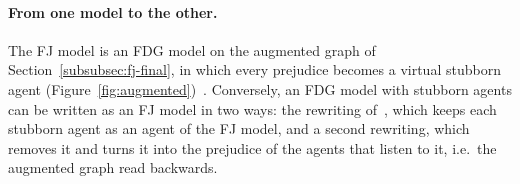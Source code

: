 \paragraph{From one model to the other.}
The FJ model is an FDG model on the augmented graph of Section~\ref{subsubsec:fj-final},
in which every prejudice becomes a virtual stubborn agent
(Figure~\ref{fig:augmented})~\cite{proskurnikov2017tutorial}. Conversely, an FDG model
with stubborn agents can be written as an FJ model in two ways: the rewriting
of~\cite{proskurnikov2017tutorial}, which keeps each stubborn agent as an agent of the FJ
model, and a second rewriting, which removes it and turns it into the prejudice of the
agents that listen to it, i.e.\ the augmented graph read backwards.

